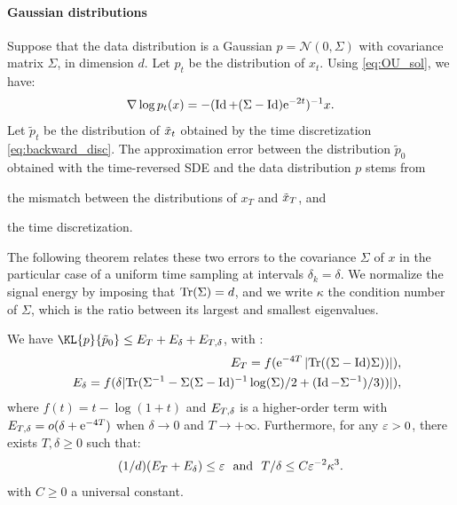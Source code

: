 \documentclass{article}
\begin{document}
\paragraph{Gaussian distributions}
Suppose that the data distribution is a Gaussian
$p =\mathcal{N}(0, \Sigma)$ with covariance matrix $\Sigma$, in dimension $d$. 
Let $p_t$ be the distribution of $x_t$.
Using \eqref{eq:OU_sol}, we have:
\begin{equation}
  \nabla \log p_t(x) = - (\operatorname{Id} + (\Sigma - \operatorname{Id})\mathrm{e}^{-2t})^{-1}x  .
\end{equation}
Let $\tilde p_t$ be the distribution of $\tilde{x}_t$ obtained by
the time discretization \eqref{eq:backward_disc}. 
The approximation error between the distribution $\tilde p_0$
obtained with the time-reversed SDE and the data distribution $p$ stems from 
\begin{enumerate*}[label=(\roman*)]
\item the mismatch between the distributions of $x_T$ and  $\tilde{x}_T$, and
\item the time discretization.
\end{enumerate*}
The following theorem relates these two errors to the covariance $\Sigma$ of $x$
in the particular case of a uniform time sampling at intervals
$\delta_k = \delta$.  We normalize the signal energy by imposing that ${\rm Tr}(\Sigma) = d$,
and we write
$\kappa$ the condition number of $\Sigma$, which is the ratio between its
largest and smallest eigenvalues.


\begin{theorem}
  \label{prop:approx_gaussian_kl}
  We have $\KL{p}{\tilde{p}_0} \leq \error_{T} + \error_{\delta} + \error_{T, \delta}$, with :
     \begin{align}
  \label{firsteq0}
    &&{E}_T =  f(\mathrm{e}^{-4T}\,\vert \mathrm{Tr}((\Sigma - \operatorname{Id})\Sigma)) \vert) , \\ 
     \label{firsteq0}
    &&{E}_{\delta} = f(\delta \vert \mathrm{Tr}(\Sigma^{-1} - \Sigma (\Sigma - \operatorname{Id})^{-1} \log(\Sigma)/2 + (\operatorname{Id} - \Sigma^{-1})/3)) \vert)  ,
  \end{align}
  where $f(t) = t-\log(1+t)$ and ${E}_{T, \delta}$ is a higher-order term with $E_{T, \delta} = o(\delta + \mathrm{e}^{-4T})$ when $\delta \to 0$ and $T \to +\infty$. Furthermore, for any $\varepsilon > 0$,
  there exists $T, \delta \geq 0$ such that:
  \begin{equation}
    \label{eq:N_conditioning}
    (1/d) ({E}_T + {E}_\delta) \leq \varepsilon~~\mbox{and}~~
    T/\delta \leq C \varepsilon^{-2} \kappa^3  .
  \end{equation}
  with $C \geq 0$ a universal constant.
  \end{theorem}
\end{document}
